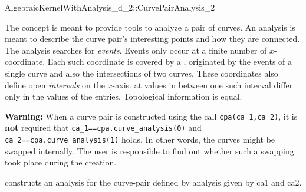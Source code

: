 \begin{ccRefConcept}{AlgebraicKernelWithAnalysis_d_2::CurvePairAnalysis_2}

\ccDefinition

The  concept is meant to provide tools to analyze 
a pair of curves. An analysis is meant to describe the curve pair's 
interesting points and how they are connected. 
The analysis searches for {\it events}. Events only
occur at a finite number of $x$-coordinate. Each such coordinate is
covered by a , 
originated by the events of a single curve
and also the intersections of two curves.
These coordinates also define open {\it intervals}
on the $x$-axis.  
at values in between one such interval
differ only in the values of the  entries. Topological 
information is equal. 

{\bf Warning:} When a curve pair is constructed using the call
{\tt cpa(ca\_1,ca\_2)}, it is {\bf not} required that 
{\tt ca\_1==cpa.curve\_analysis(0)} and {\tt ca\_2==cpa.curve\_analysis(1)} 
holds.
In other words, the curves might be swapped internally.
The user is responsible to find out whether such a swapping took place
during the creation.


\ccTypes \ccThree{}{+++++++++++++}{++++++++}






\ccCreation
{}

{constructs an analysis for the curve-pair defined by analysis given by 
ca1 and ca2. 
}

\begin{ccAdvanced}


\end{ccAdvanced}
\end{ccRefConcept}
